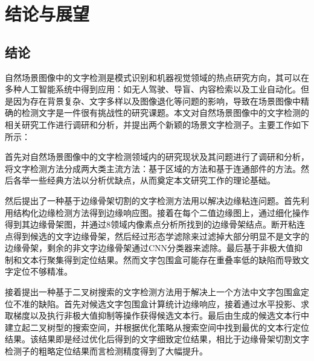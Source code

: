 ﻿%
%
%
%
%
%
\chapter{结论与展望}

    \section{结论}
    
    自然场景图像中的文字检测是模式识别和机器视觉领域的热点研究方向，其可以在多种人工智能系统中得到应用：如无人驾驶、导盲、内容检索以及工业自动化。但是因为存在背景复杂、文字多样以及图像退化等问题的影响，导致在场景图像中精确的检测文字是一件很有挑战性的研究课题。本文对自然场景图像中的文字检测的相关研究工作进行调研和分析，并提出两个新颖的场景文字检测子。主要工作如下所示：
    
    首先对自然场景图像中的文字检测领域内的研究现状及其问题进行了调研和分析，将文字检测方法分成两大类主流方法：基于区域的方法和基于连通部件的方法。然后各举一些经典方法以分析优缺点，从而奠定本文研究工作的理论基础。
    
    然后提出了一种基于边缘骨架切割的文字检测方法用以解决边缘粘连问题。首先利用结构化边缘检测方法得到边缘响应图。接着在每个二值边缘图上，通过细化操作得到其边缘骨架图，并通过8领域内像素点分析所找到的边缘骨架结点。断开粘连点得到候选的文字边缘骨架，然后经过形态学滤除来过滤掉大部分明显不是文字的边缘骨架，剩余的非文字边缘骨架通过CNN分类器来滤除。最后基于非极大值抑制和文本行聚集得到定位结果。然而文字包围盒可能存在重叠率低的缺陷而导致文字定位不够精准。
    
    接着提出一种基于二叉树搜索的文字检测方法用于解决上一个方法中文字包围盒定位不准的缺陷。首先对候选文字包围盒计算统计边缘响应，接着通过水平投影、求取梯度以及执行非极大值抑制等操作获得候选文本行。最后由生成的候选文本行中建立起二叉树型的搜索空间，并根据优化策略从搜索空间中找到最优的文本行定位结果。该结果即是经过优化后得到的文字细致定位结果，相比于边缘骨架切割文字检测子的粗略定位结果而言检测精度得到了大幅提升。

